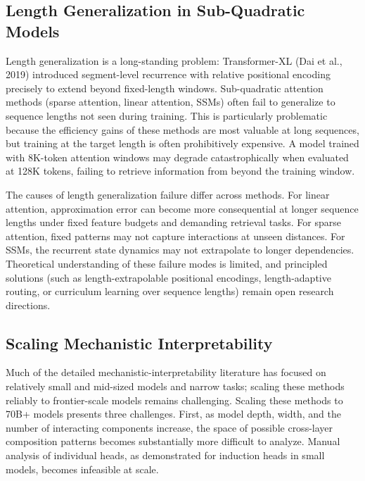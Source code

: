 \documentclass[10pt,twocolumn]{article}
\begin{document}
\subsection{Length Generalization in Sub-Quadratic Models}\label{length-generalization-in-sub-quadratic-models}

Length generalization is a long-standing problem: Transformer-XL (Dai et al., 2019) introduced segment-level recurrence with relative positional encoding precisely to extend beyond fixed-length windows. Sub-quadratic attention methods (sparse attention, linear attention, SSMs) often fail to generalize to sequence lengths not seen during training. This is particularly problematic because the efficiency gains of these methods are most valuable at long sequences, but training at the target length is often prohibitively expensive. A model trained with 8K-token attention windows may degrade catastrophically when evaluated at 128K tokens, failing to retrieve information from beyond the training window.

The causes of length generalization failure differ across methods. For linear attention, approximation error can become more consequential at longer sequence lengths under fixed feature budgets and demanding retrieval tasks. For sparse attention, fixed patterns may not capture interactions at unseen distances. For SSMs, the recurrent state dynamics may not extrapolate to longer dependencies. Theoretical understanding of these failure modes is limited, and principled solutions (such as length-extrapolable positional encodings, length-adaptive routing, or curriculum learning over sequence lengths) remain open research directions.

\subsection{Scaling Mechanistic Interpretability}\label{scaling-mechanistic-interpretability}

Much of the detailed mechanistic-interpretability literature has focused on relatively small and mid-sized models and narrow tasks; scaling these methods reliably to frontier-scale models remains challenging. Scaling these methods to 70B+ models presents three challenges. First, as model depth, width, and the number of interacting components increase, the space of possible cross-layer composition patterns becomes substantially more difficult to analyze. Manual analysis of individual heads, as demonstrated for induction heads in small models, becomes infeasible at scale.
\end{document}
